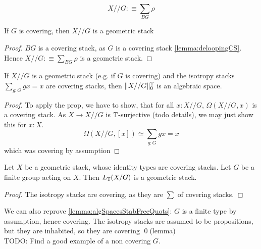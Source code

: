 \[
X // G :\equiv \sum_{BG} \rho
\]
\begin{lemma}
	If $G$ is covering, then $X // G$ is a geometric stack
\end{lemma}
\begin{proof}
	$BG$ is a covering stack, as $G$ is a covering stack \ref{lemma:deloopingCS}. Hence $X // G :\equiv \sum_{BG} \rho$ is a geometric stack.
\end{proof}
\begin{prop}
	If $X // G$ is a geometric stack (e.g. if $G$ is covering) and the isotropy stacks $\sum_{g : G} g x = x$ are covering stacks, then $\| X // G \|_0^{\mathbb{T}}$ is an algebraic space.
\end{prop}
\begin{proof}
	To apply the prop, we have to show, that for all $x : X // G$, $\Omega (X // G,x)$ is a covering stack. As $X \to X // G$ is $\mathbb{T}$-surjective (todo details), we may just show this for $x : X$.
	\[
	\Omega (X // G , [x]) \simeq \sum_{g: G} g x = x
	\]
	which was covering by assumption
\end{proof}
\begin{corollary}
	Let $X$ be a geometric stack, whose identity types are covering stacks. Let $G$ be a finite group acting on $X$. Then $L_{\mathbb{T}} (X / G)$ is a geometric stack.
\end{corollary}
\begin{proof}
	The isotropy stacks are covering, as they are $\sum$ of covering stacks.
\end{proof}
We can also reprove \ref{lemma:algSpacesStabFreeQuots}: $G$ is a finite type by assumption, hence covering. The isotropy stacks are assumed to be propositions, but they are inhabited, so they are covering \qed(lemma) \\

TODO: Find a good example of a non covering $G$.